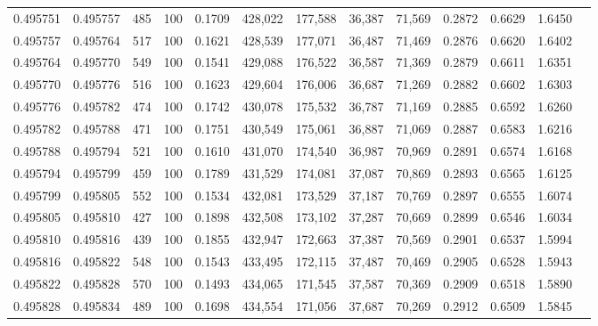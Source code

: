 \begin{tabular}{rrrrrrrrrrrrr}
0.495751 & 0.495757 &   485 & 100 &                                     0.1709 & 428,022 & 177,588 &  36,387 &  71,569 & 0.2872 & 0.6629 & 1.6450 \\
0.495757 & 0.495764 &   517 & 100 &                                     0.1621 & 428,539 & 177,071 &  36,487 &  71,469 & 0.2876 & 0.6620 & 1.6402 \\
0.495764 & 0.495770 &   549 & 100 &                                     0.1541 & 429,088 & 176,522 &  36,587 &  71,369 & 0.2879 & 0.6611 & 1.6351 \\
0.495770 & 0.495776 &   516 & 100 &                                     0.1623 & 429,604 & 176,006 &  36,687 &  71,269 & 0.2882 & 0.6602 & 1.6303 \\
0.495776 & 0.495782 &   474 & 100 &                                     0.1742 & 430,078 & 175,532 &  36,787 &  71,169 & 0.2885 & 0.6592 & 1.6260 \\
0.495782 & 0.495788 &   471 & 100 &                                     0.1751 & 430,549 & 175,061 &  36,887 &  71,069 & 0.2887 & 0.6583 & 1.6216 \\
0.495788 & 0.495794 &   521 & 100 &                                     0.1610 & 431,070 & 174,540 &  36,987 &  70,969 & 0.2891 & 0.6574 & 1.6168 \\
0.495794 & 0.495799 &   459 & 100 &                                     0.1789 & 431,529 & 174,081 &  37,087 &  70,869 & 0.2893 & 0.6565 & 1.6125 \\
0.495799 & 0.495805 &   552 & 100 &                                     0.1534 & 432,081 & 173,529 &  37,187 &  70,769 & 0.2897 & 0.6555 & 1.6074 \\
0.495805 & 0.495810 &   427 & 100 &                                     0.1898 & 432,508 & 173,102 &  37,287 &  70,669 & 0.2899 & 0.6546 & 1.6034 \\
0.495810 & 0.495816 &   439 & 100 &                                     0.1855 & 432,947 & 172,663 &  37,387 &  70,569 & 0.2901 & 0.6537 & 1.5994 \\
0.495816 & 0.495822 &   548 & 100 &                                     0.1543 & 433,495 & 172,115 &  37,487 &  70,469 & 0.2905 & 0.6528 & 1.5943 \\
0.495822 & 0.495828 &   570 & 100 &                                     0.1493 & 434,065 & 171,545 &  37,587 &  70,369 & 0.2909 & 0.6518 & 1.5890 \\
0.495828 & 0.495834 &   489 & 100 &                                     0.1698 & 434,554 & 171,056 &  37,687 &  70,269 & 0.2912 & 0.6509 & 1.5845 \\

\end{tabular}
